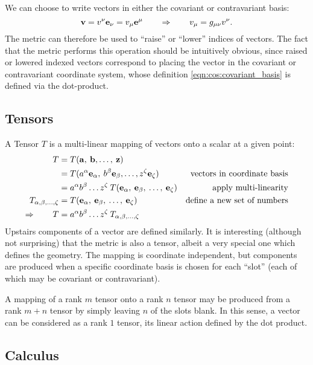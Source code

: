 We can choose to write vectors in either the covariant or contravariant basis:
\begin{equation}
  \mathbf{v}=v^\nu \mathbf{e}_\nu = v_\mu \mathbf{e}^\mu 
  \qquad\Rightarrow\qquad
  v_\mu = g_{\mu\nu} v^\nu.
  \label{eqn:cos:covariant_vector}
\end{equation}
The metric can therefore be used to ``raise'' or ``lower'' indices of vectors. The fact that the metric performs this operation should be intuitively obvious, since raised or lowered indexed vectors correspond to placing the vector in the covariant or contravariant coordinate system, whose definition \eqref{eqn:cos:covariant_basis} is defined via the dot-product.

\subsection{Tensors}
A Tensor $T$ is a multi-linear mapping of vectors onto a scalar at a given point:
\begin{align}
  T 
  &= 
  T(\mathbf{a},\:\mathbf{b},\ldots,\:\mathbf{z})
  &
  \nonumber
  \\
  &= 
  T(a^\alpha\mathbf{e}_\alpha,\:b^\beta\mathbf{e}_\beta,\ldots,z^\zeta\mathbf{e}_\zeta)  
  &\text{vectors in coordinate basis}
  \nonumber
  \\
  &= 
  a^\alpha b^\beta \ldots z^\zeta \: 
  T(\mathbf{e}_\alpha,\:\mathbf{e}_\beta,\:\ldots,\:\mathbf{e}_\zeta)  
  &\text{apply multi-linearity}
  \nonumber
  \\
  T_{\alpha,\beta,\ldots,\zeta} 
  &=  
  T(\mathbf{e}_\alpha,\:\mathbf{e}_\beta,\:\ldots,\:\mathbf{e}_\zeta)
  &\text{define a new set of numbers}
  \nonumber
  \\
  \Rightarrow\qquad
  T
  &= 
  a^\alpha b^\beta \ldots z^\zeta \: 
  T_{\alpha,\beta,\ldots,\zeta}
  &
  \nonumber
\end{align}
Upstairs components of a vector are defined similarly. It is interesting (although not surprising) that the metric is also a tensor, albeit a very special one which defines the geometry. The mapping is coordinate independent, but components are produced when a specific coordinate basis is chosen for each ``slot'' (each of which may be covariant or contravariant).

A mapping of a rank $m$ tensor onto a rank $n$ tensor may be produced from a rank $m+n$ tensor by simply leaving $n$ of the slots blank. In this sense, a vector can be considered as a rank $1$ tensor, its linear action defined by the dot product.

\subsection{Calculus}




